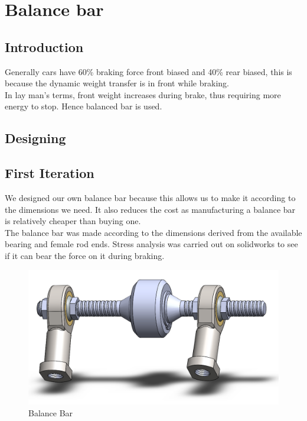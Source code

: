 \chapter{Balance bar}

\section{Introduction}
Generally cars have 60\% braking force front biased and 40\% rear biased, this is because the dynamic weight transfer is in front while braking.\\
In lay man's terms, front weight increases during brake, thus requiring more energy to stop. Hence balanced bar is used.\\
\section{Designing}
\section{First Iteration}
We designed our own balance bar because this allows us to make it according to the dimensions we need. It also reduces the cost as manufacturing a balance bar is relatively cheaper than buying one.\\
The balance bar was made according to the dimensions derived from the available bearing and female rod ends. Stress analysis was carried out on solidworks to see if it can bear the force on it during braking.
\begin{figure}[htb]
	\centering
	\includegraphics[scale=0.35]{fig/bb}
	\caption{Balance Bar}
	\label{fig:label}
\end{figure}

